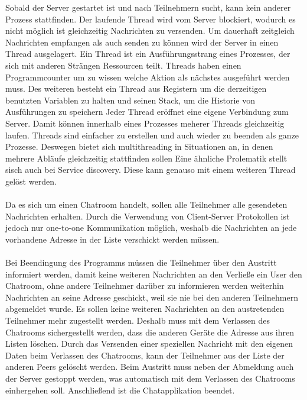 Sobald der Server gestartet ist und nach Teilnehmern sucht, kann kein anderer Prozess stattfinden. 
Der laufende Thread wird vom Server blockiert, wodurch es nicht möglich ist gleichzeitig Nachrichten zu versenden. 
Um dauerhaft zeitgleich Nachrichten empfangen als auch senden zu können wird der Server in einen Thread ausgelagert. 
Ein Thread ist ein Ausführungsstrang eines Prozesses, der sich mit anderen Strängen Ressourcen teilt.
Threads haben einen Programmcounter um zu wissen welche Aktion als nächstes ausgeführt werden muss. Des weiteren besteht ein Thread aus Registern um die derzeitigen benutzten Variablen zu halten und seinen Stack, 
um die Historie von Ausführungen zu speichern\cite[S. 103]{tan15}
Jeder Thread eröffnet eine eigene Verbindung zum Server\cite[S. 123]{steen23}. 
Damit können innerhalb eines Prozesses meherer Threads gleichzeitig laufen\cite{multithreading_2017}. 
Threads sind einfacher zu erstellen und auch wieder zu beenden als ganze Prozesse. Deswegen bietet sich multithreading in Situationen an, in denen mehrere Abläufe gleichzeitig stattfinden sollen\cite[S. 98]{tan15}
Eine ähnliche Prolematik stellt sisch auch bei Service discovery. Diese kann genauso mit einem weiteren Thread gelöst werden. 
\\
\\
Da es sich um einen Chatroom handelt, sollen alle Teilnehmer alle gesendeten Nachrichten erhalten.
Durch die Verwendung von Client-Server Protokollen ist jedoch nur one-to-one Kommunikation möglich, weshalb die Nachrichten an jede vorhandene Adresse in der Liste verschickt werden müssen.
\\
\\
Bei Beendingung des Programms müssen die Teilnehmer über den Austritt informiert werden, damit keine weiteren Nachrichten an den 
Verließe ein User den Chatroom, ohne andere Teilnehmer darüber zu informieren werden weiterhin Nachrichten an seine Adresse geschickt, weil sie nie bei den anderen Teilnehmern abgemeldet wurde.
Es sollen keine weiteren Nachrichten an den austretenden Teilnehmer mehr zugestellt werden.
Deshalb muss mit dem Verlassen des Chatrooms sichergestellt werden, dass die anderen Geräte die Adresse aus ihren Listen löschen.
Durch das Versenden einer speziellen Nachricht mit den eigenen Daten beim Verlassen des Chatrooms, kann der Teilnehmer aus der Liste der anderen Peers gelöscht werden. 
Beim Austritt muss neben der Abmeldung auch der Server gestoppt werden, was automatisch mit dem Verlassen des Chatrooms einhergehen soll. %
Anschließend ist die Chatapplikation beendet.
